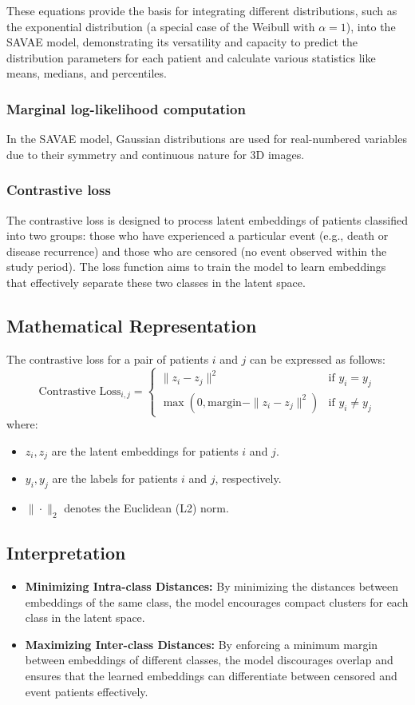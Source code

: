 \documentclass{article}
\begin{document}
These equations provide the basis for integrating different distributions, such as the exponential distribution (a special case of the Weibull with \(\alpha = 1\)), into the SAVAE model, demonstrating its versatility and capacity to predict the distribution parameters for each patient and calculate various statistics like means, medians, and percentiles.

\subsubsection{Marginal log-likelihood computation}
In the SAVAE model, Gaussian distributions are used for real-numbered variables due to their symmetry and continuous nature for 3D images.
\subsubsection{Contrastive loss}
The contrastive loss is designed to process latent embeddings of patients classified into two groups: those who have experienced a particular event (e.g., death or disease recurrence) and those who are censored (no event observed within the study period). The loss function aims to train the model to learn embeddings that effectively separate these two classes in the latent space. \subsection*{Mathematical Representation} The contrastive loss for a pair of patients $i$ and $j$ can be expressed as follows: \[ \text{Contrastive Loss}_{i,j} = \begin{cases} \|z_i - z_j\|^2 & \text{if } y_i = y_j \\ \max(0, \text{margin} - \|z_i - z_j\|^2) & \text{if } y_i \neq y_j \end{cases} \] where: \begin{itemize} \item $z_i, z_j$ are the latent embeddings for patients $i$ and $j$. \item $y_i, y_j$ are the labels for patients $i$ and $j$, respectively. \item $\|\cdot\|_2$ denotes the Euclidean (L2) norm. \end{itemize} \subsection*{Interpretation} \begin{itemize} \item \textbf{Minimizing Intra-class Distances:} By minimizing the distances between embeddings of the same class, the model encourages compact clusters for each class in the latent space. \item \textbf{Maximizing Inter-class Distances:} By enforcing a minimum margin between embeddings of different classes, the model discourages overlap and ensures that the learned embeddings can differentiate between censored and event patients effectively. \end{itemize}
\end{document}
